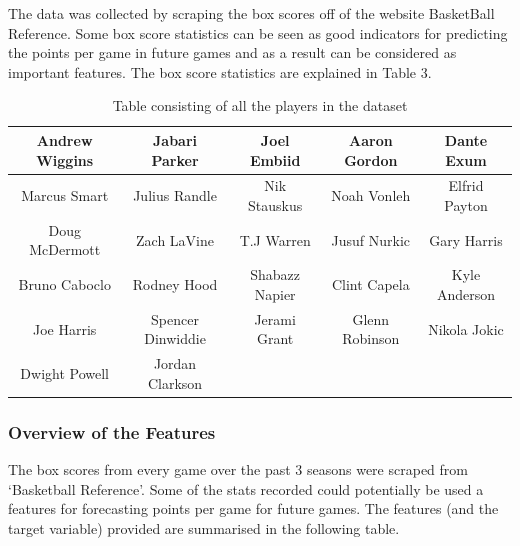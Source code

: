 \documentclass[a4paper,11pt,twoside]{article}
\begin{document}
The data was collected by scraping the box scores off of the website BasketBall Reference. Some box score statistics can be seen as good indicators for predicting the points per game in future games and as a result can be considered as important features. The box score statistics are explained in Table 3.

\vspace{5mm}
\begin{table} [h!]
\begin{center}
\begin{tabular}{ ccccc } 
 \hline
Andrew Wiggins & Jabari Parker & Joel Embiid & Aaron  Gordon& Dante Exum \\ 
 \hline
Marcus Smart & Julius Randle & Nik Stauskus & Noah Vonleh & Elfrid Payton \\ 
 \hline
 Doug McDermott & Zach LaVine & T.J Warren & Jusuf Nurkic & Gary Harris\\
 \hline
 Bruno Caboclo & Rodney Hood & Shabazz Napier & Clint Capela & Kyle Anderson\\
 \hline 
 Joe Harris & Spencer Dinwiddie & Jerami Grant & Glenn Robinson & Nikola Jokic\\
 \hline
  Dwight Powell & Jordan Clarkson\\
\hline
\end{tabular}
\caption{Table consisting of all the players in the dataset}
\end{center}
\end{table}

 \subsubsection{Overview of the Features}
The box scores from every game over the past 3 seasons  were scraped from `Basketball Reference'. Some of the stats recorded could potentially be used a features for forecasting points per game for future games. The features (and the target variable) provided are summarised in the following table. 
\end{document}
